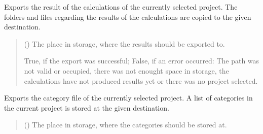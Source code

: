 \documentclass[letterpaper,10pt,english]{sphinxmanual}
\begin{document}
\begin{fulllineitems}
\begin{fulllineitems}
\label{\detokenize{apidoc/src.osm_configurator.control:src.osm_configurator.control.control.Control.export_calculations}}
\pysigstartsignatures
{}
\pysigstopsignatures
\sphinxAtStartPar
Exports the result of the calculations of the currently selected project.
The folders and files regarding the results of the calculations are copied to the given destination.
\begin{quote}\begin{description}
\sphinxAtStartPar
{} () \textendash{} The place in storage, where the results should be exported to.

\sphinxAtStartPar
True, if the export was successful; False, if an error occurred: The path was not valid or occupied, there was not enought space in storage, the calculations have not produced results yet or there was no project selected.

\sphinxAtStartPar
{}

\end{description}\end{quote}

\end{fulllineitems}


\begin{fulllineitems}
\label{\detokenize{apidoc/src.osm_configurator.control:src.osm_configurator.control.control.Control.export_configurations}}
\pysigstartsignatures
{}
\pysigstopsignatures
\sphinxAtStartPar
Exports the category file of the currently selected project.
A list of categories in the current project is stored at the given destination.
\begin{quote}\begin{description}
\sphinxAtStartPar
{} () \textendash{} The place in storage, where the categories should be stored at.


\end{description}
\end{quote}
\end{fulllineitems}
\end{fulllineitems}
\end{document}
